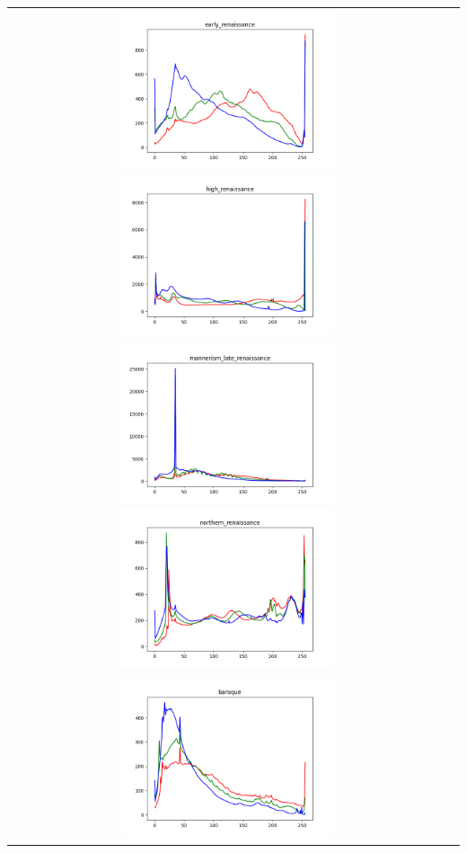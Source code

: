 \documentclass{article}
\begin{document}
		\begin{center}
			\begin{tabular}{cc}

				\noindent
				\includegraphics[width=0.5\textwidth]{plots/early_renaissance.png}
				\includegraphics[width=0.5\textwidth]{plots/high_renaissance.png}\\[2em]
				\includegraphics[width=0.5\textwidth]{plots/mannerism_late_renaissance.png}
				\includegraphics[width=0.5\textwidth]{plots/northern_renaissance.png}\\[2em]
				\includegraphics[width=0.5\textwidth]{plots/baroque.png}

\end{tabular}
\end{center}
\end{document}
